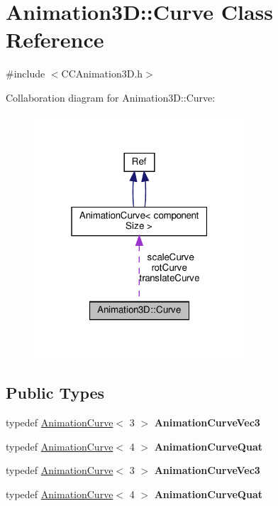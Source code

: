 \hypertarget{classAnimation3D_1_1Curve}{}\section{Animation3D\+:\+:Curve Class Reference}
\label{classAnimation3D_1_1Curve}


{\ttfamily \#include $<$C\+C\+Animation3\+D.\+h$>$}



Collaboration diagram for Animation3D\+:\+:Curve\+:
\nopagebreak
\begin{figure}[H]
\begin{center}
\leavevmode
\includegraphics[width=223pt]{classAnimation3D_1_1Curve__coll__graph}
\end{center}
\end{figure}
\subsection*{Public Types}
\begin{DoxyCompactItemize}
\item 
\mbox{\label{classAnimation3D_1_1Curve_af297f4367ebff4fe9e4e42a2eb7bb2e0}} 
typedef \hyperlink{classAnimationCurve}{Animation\+Curve}$<$ 3 $>$ {\bfseries Animation\+Curve\+Vec3}
\item 
\mbox{\label{classAnimation3D_1_1Curve_a5c521d22d3b00aaf615b58cfc5524739}} 
typedef \hyperlink{classAnimationCurve}{Animation\+Curve}$<$ 4 $>$ {\bfseries Animation\+Curve\+Quat}
\item 
\mbox{\label{classAnimation3D_1_1Curve_af297f4367ebff4fe9e4e42a2eb7bb2e0}} 
typedef \hyperlink{classAnimationCurve}{Animation\+Curve}$<$ 3 $>$ {\bfseries Animation\+Curve\+Vec3}
\item 
\mbox{\label{classAnimation3D_1_1Curve_a5c521d22d3b00aaf615b58cfc5524739}} 
typedef \hyperlink{classAnimationCurve}{Animation\+Curve}$<$ 4 $>$ {\bfseries Animation\+Curve\+Quat}
\end{DoxyCompactItemize}
